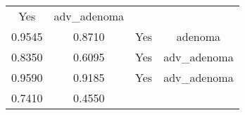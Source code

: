 \documentclass[12pt,]{article}
\begin{document}
\begin{longtable}[]{@{}cccc@{}}
\begin{minipage}[t]{0.22\columnwidth}
Yes\strut
\end{minipage} & \begin{minipage}[t]{0.16\columnwidth}\centering\strut
adv\_adenoma\strut
\end{minipage}\tabularnewline
\begin{minipage}[t]{0.24\columnwidth}\centering\strut
0.9545\strut
\end{minipage} & \begin{minipage}[t]{0.26\columnwidth}\centering\strut
0.8710\strut
\end{minipage} & \begin{minipage}[t]{0.22\columnwidth}\centering\strut
Yes\strut
\end{minipage} & \begin{minipage}[t]{0.16\columnwidth}\centering\strut
adenoma\strut
\end{minipage}\tabularnewline
\begin{minipage}[t]{0.24\columnwidth}\centering\strut
0.8350\strut
\end{minipage} & \begin{minipage}[t]{0.26\columnwidth}\centering\strut
0.6095\strut
\end{minipage} & \begin{minipage}[t]{0.22\columnwidth}\centering\strut
Yes\strut
\end{minipage} & \begin{minipage}[t]{0.16\columnwidth}\centering\strut
adv\_adenoma\strut
\end{minipage}\tabularnewline
\begin{minipage}[t]{0.24\columnwidth}\centering\strut
0.9590\strut
\end{minipage} & \begin{minipage}[t]{0.26\columnwidth}\centering\strut
0.9185\strut
\end{minipage} & \begin{minipage}[t]{0.22\columnwidth}\centering\strut
Yes\strut
\end{minipage} & \begin{minipage}[t]{0.16\columnwidth}\centering\strut
adv\_adenoma\strut
\end{minipage}\tabularnewline
\begin{minipage}[t]{0.24\columnwidth}\centering\strut
0.7410\strut
\end{minipage} & \begin{minipage}[t]{0.26\columnwidth}\centering\strut
0.4550\strut
\end{minipage} & \begin{minipage}[t]{0.22\columnwidth}\centering\strut

\end{minipage}
\end{longtable}
\end{document}
